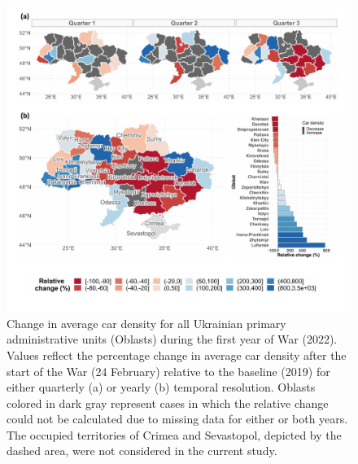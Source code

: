 \documentclass[sn-basic]{sn-jnl}%
\begin{document}
{%


\begin{figure}[hbtp]
\begin{center}
\includegraphics[width=\textwidth]{Figures/Spatial_dyn_all_updated.pdf}
\end{center}
\caption{Change in average car density for all Ukrainian primary administrative units (Oblasts) during the first year of War (2022). Values reflect the percentage change in average car density after the start of the War (24 February) relative to the baseline (2019) for either quarterly (a) or yearly (b) temporal resolution. Oblasts colored in dark gray represent cases in which the relative change could not be calculated due to missing data for either or both years. The occupied territories of Crimea and Sevastopol, depicted by the dashed area, were not considered in the current study.}\label{Fig_CarSpatDyn}
\end{figure}

}
\end{document}
